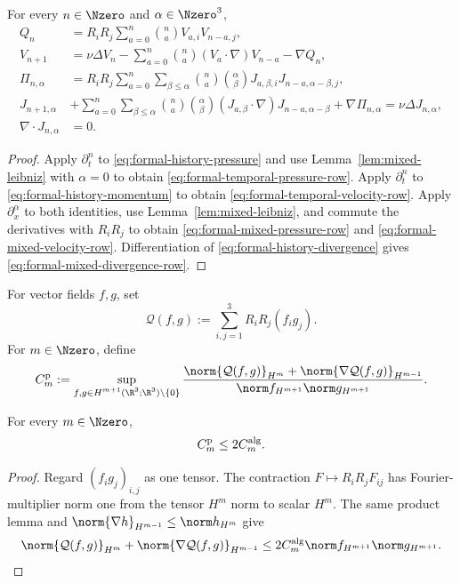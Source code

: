 \begin{proposition}
\label{prop:formal-mixed-recurrences}
For every \(n\in\Nzero\) and \(\alpha\in\Nzero^3\),
\begin{align}
 Q_n
 &=R_iR_j
 \sum_{a=0}^{n}\binom na V_{a,i}V_{n-a,j},
 \label{eq:formal-temporal-pressure-row}\\
 V_{n+1}
 &=
 \nu\Delta V_n
 -\sum_{a=0}^{n}\binom na(V_a\cdot\nabla)V_{n-a}
 -\nabla Q_n,
 \label{eq:formal-temporal-velocity-row}\\
 \Pi_{n,\alpha}
 &=R_iR_j
 \sum_{a=0}^{n}\sum_{\beta\le\alpha}
 \binom na\binom{\alpha}{\beta}
 J_{a,\beta,i}J_{n-a,\alpha-\beta,j},
 \label{eq:formal-mixed-pressure-row}\\
 J_{n+1,\alpha}
 &+
 \sum_{a=0}^{n}\sum_{\beta\le\alpha}
 \binom na\binom{\alpha}{\beta}
 (J_{a,\beta}\cdot\nabla)
 J_{n-a,\alpha-\beta}
 +\nabla\Pi_{n,\alpha}
 =\nu\Delta J_{n,\alpha},
 \label{eq:formal-mixed-velocity-row}\\
 \nabla\cdot J_{n,\alpha}&=0.
 \label{eq:formal-mixed-divergence-row}
\end{align}
\end{proposition}

\begin{proof}
Apply \(\partial_t^n\) to \eqref{eq:formal-history-pressure} and use
Lemma~\ref{lem:mixed-leibniz} with \(\alpha=0\) to obtain
\eqref{eq:formal-temporal-pressure-row}.  Apply \(\partial_t^n\) to
\eqref{eq:formal-history-momentum} to obtain
\eqref{eq:formal-temporal-velocity-row}.  Apply
\(\partial_x^\alpha\) to both identities, use
Lemma~\ref{lem:mixed-leibniz}, and commute the derivatives with \(R_iR_j\)
to obtain \eqref{eq:formal-mixed-pressure-row} and
\eqref{eq:formal-mixed-velocity-row}.  Differentiation of
\eqref{eq:formal-history-divergence} gives
\eqref{eq:formal-mixed-divergence-row}.
\end{proof}

\begin{definition}
\label{def:formal-canonical-bilinear-constants}
For vector fields \(f,g\), set
\[
 \mathcal Q(f,g):=\sum_{i,j=1}^3R_iR_j(f_i g_j).
\]
For \(m\in\Nzero\), define
\[
 C_m^{\rm p}:=
 \sup_{\substack{
 f,g\in H^{m+1}(\R^3;\R^3)\setminus\{0\}}}
 \frac{
 \norm{\mathcal Q(f,g)}_{H^m}
 +\norm{\nabla\mathcal Q(f,g)}_{H^{m-1}}}
 {\norm f_{H^{m+1}}\norm g_{H^{m+1}}}.
\]
\end{definition}

\begin{lemma}
\label{lem:formal-canonical-bilinear-constants}
For every \(m\in\Nzero\),
\[
 C_m^{\rm p}\le2C_m^{\rm alg}.
\]
\end{lemma}
\begin{proof}
Regard \((f_i g_j)_{i,j}\) as one tensor.  The contraction
\(F\mapsto R_iR_jF_{ij}\) has Fourier-multiplier norm one from the tensor
\(H^m\) norm to scalar \(H^m\).  The same product lemma and
\(\norm{\nabla h}_{H^{m-1}}\le\norm h_{H^m}\) give
\[
 \norm{\mathcal Q(f,g)}_{H^m}
 +\norm{\nabla\mathcal Q(f,g)}_{H^{m-1}}
 \le2C_m^{\rm alg}\norm f_{H^{m+1}}\norm g_{H^{m+1}}.
\]
\end{proof}

